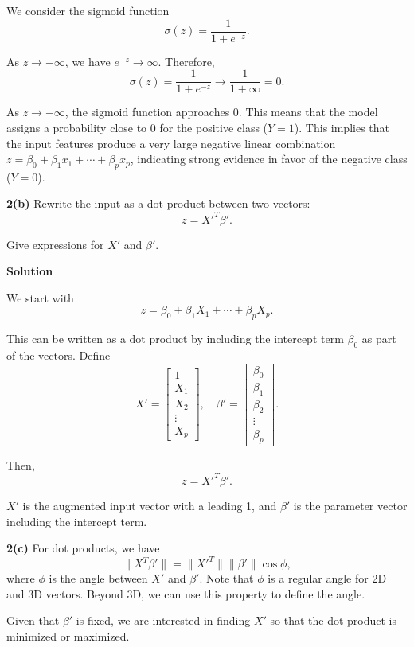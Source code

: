 \documentclass[10pt]{article}
\begin{document}
\begin{enumerate}[label=\roman*.]
    We consider the sigmoid function
    \[
    \sigma(z) = \frac{1}{1 + e^{-z}}.
    \]
    
    As $z \to -\infty$, we have $e^{-z} \to \infty$. Therefore,
    \[
    \sigma(z) = \frac{1}{1 + e^{-z}} \to \frac{1}{1 + \infty} = 0.
    \]
    
    As $z \to -\infty$, the sigmoid function approaches 0. This means that the model assigns a probability close to 0 for the positive class ($Y = 1$). This implies that the input features produce a very large negative linear combination $z = \beta_0 + \beta_1 x_1 + \cdots + \beta_p x_p$, indicating strong evidence in favor of the negative class ($Y = 0$).
    
\end{enumerate}

\textbf{2(b)} Rewrite the input as a dot product between two vectors:
\[
z = X'^T \beta'.
\]

Give expressions for $X'$ and $\beta'$.

\textbf{Solution}

We start with
\[
z = \beta_0 + \beta_1 X_1 + \cdots + \beta_p X_p.
\]

This can be written as a dot product by including the intercept term $\beta_0$ as part of the vectors. Define
\[
X' = 
\begin{bmatrix}
	1 \\
	X_1 \\
	X_2 \\
	\vdots \\
	X_p
\end{bmatrix},
\quad
\beta' = 
\begin{bmatrix}
	\beta_0 \\
	\beta_1 \\
	\beta_2 \\
	\vdots \\
	\beta_p
\end{bmatrix}.
\]

Then,
\[
z = X'^T \beta'.
\]

$X'$ is the augmented input vector with a leading 1, and $\beta'$ is the parameter vector including the intercept term.

\textbf{2(c)} For dot products, we have
\[
\|X^T \beta'\| = \|X'^T\| \|\beta'\| \cos \phi,
\]
where $\phi$ is the angle between $X'$ and $\beta'$. Note that $\phi$ is a regular angle for 2D and 3D vectors. Beyond 3D, we can use this property to define the angle.

Given that $\beta'$ is fixed, we are interested in finding $X'$ so that the dot product is minimized or maximized.
\end{document}
